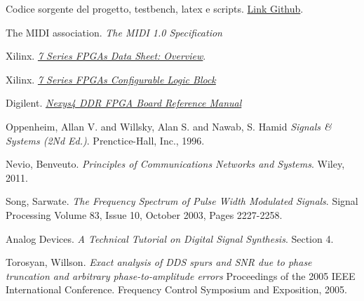 \begin{thebibliography}{9}
Codice sorgente del progetto, testbench, latex e scripts.
\href{http://github.com/doppioandante/tesi}{Link Github}.

The MIDI association.
\textit{The MIDI 1.0 Specification}

Xilinx.
\href{https://www.xilinx.com/support/documentation/data_sheets/ds180_7Series_Overview.pdf}{\textit{7 Series FPGAs Data Sheet: Overview}}.

Xilinx.
\href{https://www.xilinx.com/support/documentation/user_guides/ug474_7Series_CLB.pdf}{\textit{7 Series FPGAs Configurable Logic Block}}

Digilent.
\href{https://www.xilinx.com/support/documentation/university/XUP%20Boards/XUPNexys4DDR/documentation/Nexys4-DDR_rm.pdf}{\textit{Nexys4 DDR FPGA Board Reference Manual}}

Oppenheim, Allan V. and Willsky, Alan S. and Nawab, S. Hamid
\textit{Signals \& Systems (2Nd Ed.)}.
Prenctice-Hall, Inc., 1996.

Nevio, Benveuto.
\textit{Principles of Communications Networks and Systems}.
Wiley, 2011.

Song, Sarwate.
\textit{The Frequency Spectrum of Pulse Width Modulated Signals}.
Signal Processing Volume 83, Issue 10, October 2003, Pages 2227-2258.

Analog Devices.
\textit{A Technical Tutorial on Digital Signal Synthesis}.
Section 4.

Torosyan, Willson.
\textit{Exact analysis of DDS spurs and SNR due to phase truncation and arbitrary phase-to-amplitude errors}
Proceedings of the 2005 IEEE International Conference.
Frequency Control Symposium and Exposition, 2005. 
\end{thebibliography}
